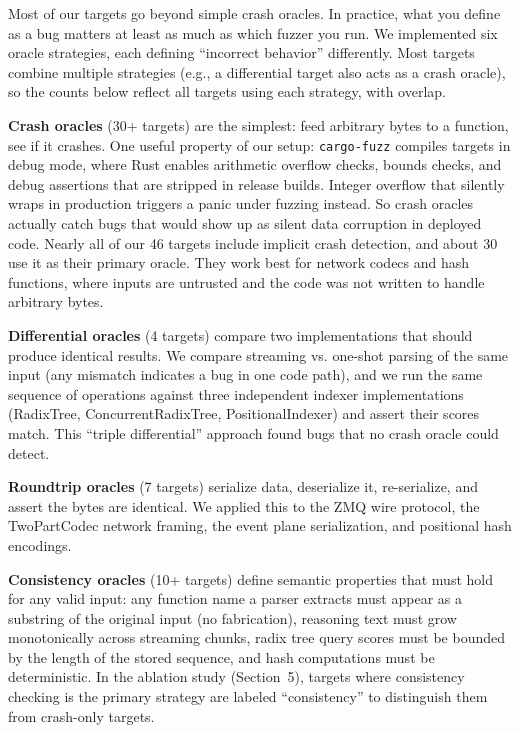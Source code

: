 \documentclass[11pt]{article}
\begin{document}
Most of our targets go beyond simple crash oracles. In practice, what you define as a bug matters at least as much as which fuzzer you run. We implemented six oracle strategies, each defining ``incorrect behavior'' differently. Most targets combine multiple strategies (e.g., a differential target also acts as a crash oracle), so the counts below reflect all targets using each strategy, with overlap.

\textbf{Crash oracles} (30+ targets) are the simplest: feed arbitrary bytes to a function, see if it crashes. One useful property of our setup: \texttt{cargo-fuzz} compiles targets in debug mode, where Rust enables arithmetic overflow checks, bounds checks, and debug assertions that are stripped in release builds. Integer overflow that silently wraps in production triggers a panic under fuzzing instead. So crash oracles actually catch bugs that would show up as silent data corruption in deployed code. Nearly all of our 46 targets include implicit crash detection, and about 30 use it as their primary oracle. They work best for network codecs and hash functions, where inputs are untrusted and the code was not written to handle arbitrary bytes.

\textbf{Differential oracles} (4 targets) compare two implementations that should produce identical results. We compare streaming vs. one-shot parsing of the same input (any mismatch indicates a bug in one code path), and we run the same sequence of operations against three independent indexer implementations (RadixTree, ConcurrentRadixTree, PositionalIndexer) and assert their scores match. This ``triple differential'' approach found bugs that no crash oracle could detect.

\textbf{Roundtrip oracles} (7 targets) serialize data, deserialize it, re-serialize, and assert the bytes are identical. We applied this to the ZMQ wire protocol, the TwoPartCodec network framing, the event plane serialization, and positional hash encodings.

\textbf{Consistency oracles} (10+ targets) define semantic properties that must hold for any valid input: any function name a parser extracts must appear as a substring of the original input (no fabrication), reasoning text must grow monotonically across streaming chunks, radix tree query scores must be bounded by the length of the stored sequence, and hash computations must be deterministic. In the ablation study (Section~5), targets where consistency checking is the primary strategy are labeled ``consistency'' to distinguish them from crash-only targets.
\end{document}
